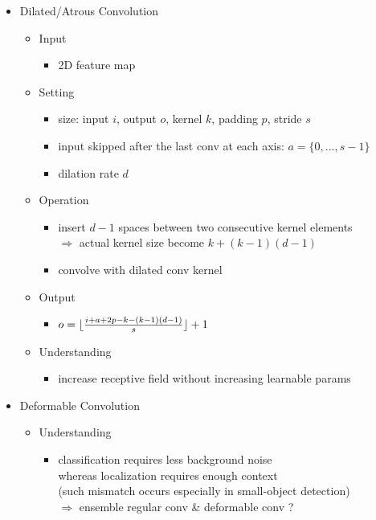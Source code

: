\begin{itemize}
\item Dilated/Atrous Convolution
	\begin{itemize}
	\item Input
		\begin{itemize}
		\item 2D feature map
		\end{itemize}
	\item Setting
		\begin{itemize}
		\item size: input $i$, output $o$, kernel $k$, padding $p$, stride $s$
		\item input skipped after the last conv at each axis: $a=\{0,...,s-1\}$
		\item dilation rate $d$
		\end{itemize}
	\item Operation
		\begin{itemize}
		\item insert $d-1$ spaces between two consecutive kernel elements \\
		$\Rightarrow$ actual kernel size become $k+(k-1)(d-1)$
		\item convolve with dilated conv kernel
		\end{itemize}
	\item Output
		\begin{itemize}
		\item $o=\lfloor\frac{i+a+2p-k-(k-1)(d-1)}{s}\rfloor+1$
		\end{itemize}
	\item Understanding
		\begin{itemize}
		\item increase receptive field without increasing learnable params
		\end{itemize}
	\end{itemize}

\item Deformable Convolution
	\begin{itemize}
	\item Understanding
		\begin{itemize}
		\item classification requires less background noise \\
		whereas localization requires enough context \\
		(such mismatch occurs especially in small-object detection) \\
		$\Rightarrow$ ensemble regular conv \& deformable conv ?
		\end{itemize}
	\end{itemize}



\end{itemize}
